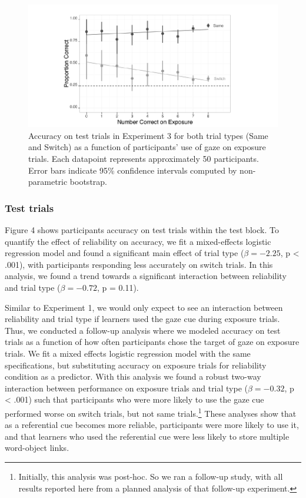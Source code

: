 \documentclass[12pt,]{article}
\let\rmarkdownfootnote\footnote%
\def\footnote{\protect\rmarkdownfootnote}
\begin{document}
\begin{figure}[htbp]
\centering
\includegraphics{figs/test accuracy expt 3-1.pdf}
\caption{Accuracy on test trials in Experiment 3 for both trial types
(Same and Switch) as a function of participants' use of gaze on exposure
trials. Each datapoint represents approximately 50 participants. Error
bars indicate 95\% confidence intervals computed by non-parametric
bootstrap.}
\end{figure}

\subsubsection{Test trials}\label{test-trials-2}

Figure 4 shows participants accuracy on test trials within the test
block. To quantify the effect of reliability on accuracy, we fit a
mixed-effects logistic regression model and found a significant main
effect of trial type (\(\beta = -2.25\), p \textless{} .001), with
participants responding less accurately on switch trials. In this
analysis, we found a trend towards a significant interaction between
reliability and trial type (\(\beta = -0.72\), p = 0.11).

Similar to Experiment 1, we would only expect to see an interaction
between reliability and trial type if learners used the gaze cue during
exposure trials. Thus, we conducted a follow-up analysis where we
modeled accuracy on test trials as a function of how often participants
chose the target of gaze on exposure trials. We fit a mixed effects
logistic regression model with the same specifications, but substituting
accuracy on exposure trials for reliability condition as a predictor.
With this analysis we found a robust two-way interaction between
performance on exposure trials and trial type (\(\beta = -0.32\), p
\textless{} .001) such that participants who were more likely to use the
gaze cue performed worse on switch trials, but not same
trials.\footnote{Initially, this analysis was post-hoc. So we ran a follow-up study, with all results reported here from a planned analysis of that follow-up experiment.}
These analyses show that as a referential cue becomes more reliable,
participants were more likely to use it, and that learners who used the
referential cue were less likely to store multiple word-object links.
\end{document}
